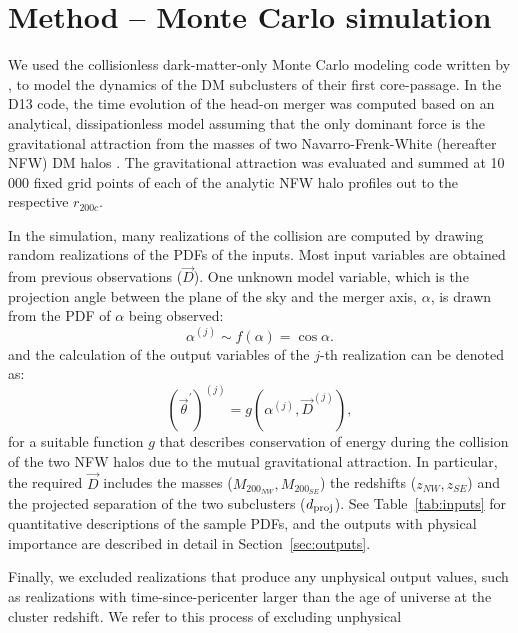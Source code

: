\documentclass[ucdthesis.tex]{subfiles}
\begin{document}
    \section{Method -- Monte Carlo simulation} 
    \label{sec:method}
    We used the collisionless 
    dark-matter-only Monte Carlo modeling code written by , to
    model the dynamics of the DM subclusters of their first core-passage.
    In the D13 code, the time evolution of the
    head-on merger was computed based on an analytical, dissipationless model
    assuming that the only dominant force is the gravitational attraction from
    the masses of two Navarro-Frenk-White (hereafter NFW) DM halos
    \citep{Navarro96}. 
    The gravitational attraction was evaluated and summed at 10 000 fixed grid
    points of each of the analytic NFW halo profiles out to the respective
    $r_{200c}$.\par
    In the simulation, many realizations of the collision are
    computed by drawing random realizations of the PDFs of the inputs. Most
    input variables are obtained from previous observations ($\vec{D}$).  One
    unknown model variable, which is the projection angle between the plane of the sky
    and the merger axis, $\alpha$, is drawn from the PDF of $\alpha$ being
    observed: 
    \begin{equation}
    	\alpha^{(j)} \sim f(\alpha) = \cos \alpha.
    \end{equation}
    and the calculation of the output variables of the $j$-th realization can be denoted as: 
    \begin{equation}
    	(\vec{\theta}^\prime)^{(j)} = g(\alpha^{(j)}, \vec{D}^{(j)}), 
    \end{equation}    
    for a suitable function $g$ that describes conservation of energy during
    the collision of the two NFW halos due to the mutual gravitational
    attraction.  In particular, the required $\vec{D}$ includes the masses ($M_{200_{NW}},M_{200_{SE}}$) the redshifts ($z_{NW}, z_{SE}$) and the
    projected separation of the two subclusters ($d_{\rm proj}$).  See
    Table~\ref{tab:inputs} for quantitative descriptions of the sample PDFs, and
    the outputs with physical importance are described in detail in Section~\ref{sec:outputs}. \par
    Finally, we excluded realizations that produce any unphysical output
    values, such as realizations with time-since-pericenter larger than the age of universe at the
    cluster redshift.  We refer to this process of excluding unphysical
\end{document}
